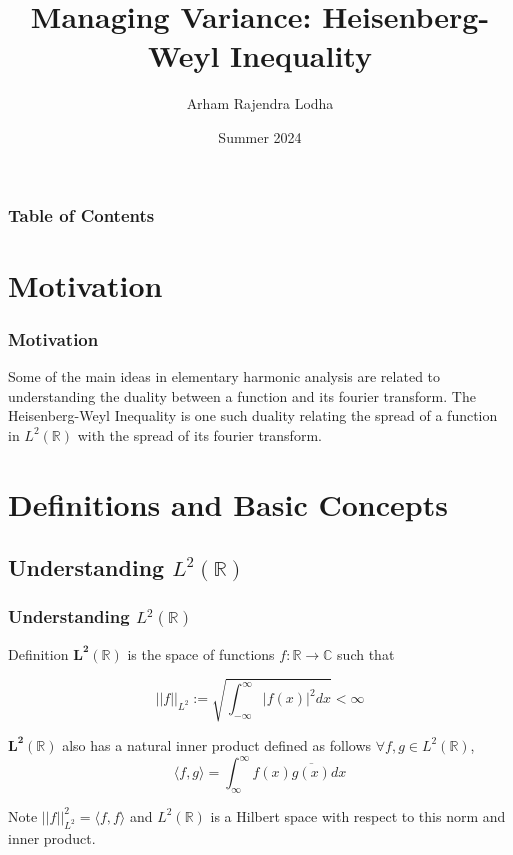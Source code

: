 \documentclass{beamer}
\title{Managing Variance: Heisenberg-Weyl Inequality}
\author{Arham Rajendra Lodha}
\institute{University of Texas at Austin}
\date{Summer 2024}
\newcommand{\C}{\mathbb{C}}
\newcommand{\R}{\mathbb{R}}
\newcommand{\aabs}[1]{\left\lvert\left\lvert #1\right\rvert\right\rvert}
\newcommand{\abs}[1]{\left\lvert #1\right\rvert}
\newcommand{\angles}[1]{\langle #1 \rangle}
\begin{document}
\frame{\titlepage}

\begin{frame}
    \frametitle{Table of Contents}
    \tableofcontents
\end{frame}

\section{Motivation}
\begin{frame}
    \frametitle{Motivation}

    Some of the main ideas in elementary harmonic analysis are related to understanding the duality between a function and its fourier transform. The Heisenberg-Weyl Inequality is one such duality relating the spread of a function in $L^2(\R)$ with the spread of its fourier transform.      
    
\end{frame}

\section{Definitions and Basic Concepts}
\subsection{Understanding $L^2(\R)$ }
\begin{frame}
    \frametitle{Understanding $L^2(\R)$ }

    \begin{block}{Definition}
        $\mathbf{L^2(\R)}$ is the space of functions $f: \R \to \C$ such that
        
        \[
            \abs{\abs{f}}_{L^2} := \sqrt{\int_{-\infty}^{\infty} |f(x)|^2 dx} < \infty 
        \]

        \pause

        $\mathbf{L^2(\R)}$ also has a natural inner product defined as follows $\forall f, g \in L^2(\R)$, \[\angles{f, g} = \int_{\infty}^{\infty} f(x) \overline{g(x)} dx\]
        
        Note $\aabs{f}_{L^2}^2 = \angles{f, f}$ and $L^2(\R)$ is a Hilbert space with respect to this norm and inner product.   
    \end{block}
\end{frame}
\end{document}
